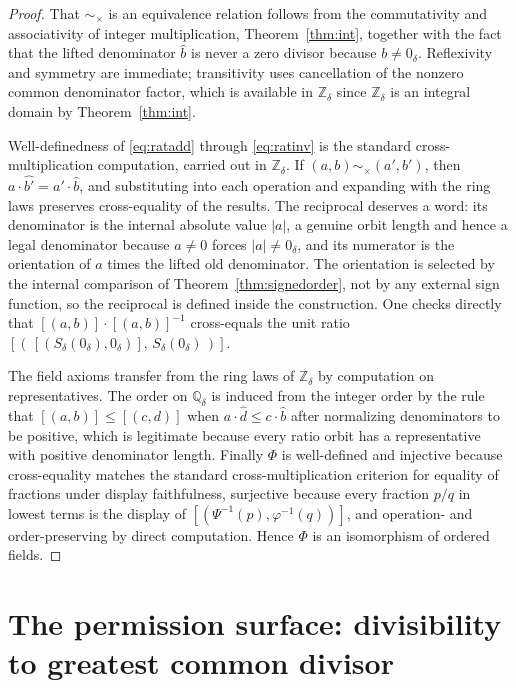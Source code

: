 \documentclass[11pt,a4paper]{article}
\theoremstyle{definition}
\theoremstyle{remark}
\newcommand{\Zd}{\mathbb{Z}_\delta}
\newcommand{\Qd}{\mathbb{Q}_\delta}
\newcommand{\Sd}{S_\delta}
\newcommand{\zd}{0_\delta}
\begin{document}
\begin{proof}
That $\sim_\times$ is an equivalence relation follows from the commutativity and
associativity of integer multiplication, Theorem~\ref{thm:int}, together with
the fact that the lifted denominator $\widehat{b}$ is never a zero divisor
because $b \neq \zd$. Reflexivity and symmetry are immediate; transitivity uses
cancellation of the nonzero common denominator factor, which is available in
$\Zd$ since $\Zd$ is an integral domain by Theorem~\ref{thm:int}.

Well-definedness of \eqref{eq:ratadd} through \eqref{eq:ratinv} is the standard
cross-multiplication computation, carried out in $\Zd$. If $(a, b) \sim_\times (a', b')$,
then $a \cdot \widehat{b'} = a' \cdot \widehat{b}$, and substituting into each
operation and expanding with the ring laws preserves cross-equality of the
results. The reciprocal deserves a word: its denominator is the internal
absolute value $|a|$, a genuine orbit length and hence a legal denominator
because $a \neq 0$ forces $|a| \neq \zd$, and its numerator is the orientation
of $a$ times the lifted old denominator. The orientation is selected by the
internal comparison of Theorem~\ref{thm:signedorder}, not by any external sign
function, so the reciprocal is defined inside the construction. One checks
directly that $[(a, b)] \cdot [(a, b)]^{-1}$ cross-equals the unit ratio
$[(\,[(\Sd(\zd), \zd)],\, \Sd(\zd)\,)]$.

The field axioms transfer from the ring laws of $\Zd$ by computation on
representatives. The order on $\Qd$ is induced from the integer order by the rule
that $[(a, b)] \leq [(c, d)]$ when $a \cdot \widehat{d} \leq c \cdot \widehat{b}$
after normalizing denominators to be positive, which is legitimate because every
ratio orbit has a representative with positive denominator length. Finally
$\Phi$ is well-defined and injective because cross-equality matches the standard
cross-multiplication criterion for equality of fractions under display
faithfulness, surjective because every fraction $p/q$ in lowest terms is the
display of $[(\Psi^{-1}(p), \varphi^{-1}(q))]$, and operation- and
order-preserving by direct computation. Hence $\Phi$ is an isomorphism of
ordered fields.
\end{proof}

\section{The permission surface: divisibility to greatest common divisor}\label{sec:permission}
\end{document}
